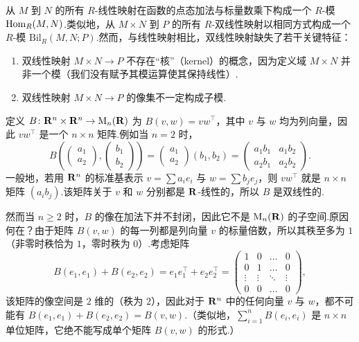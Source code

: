 从 $M$ 到 $N$ 的所有 $R$-线性映射在函数的点态加法与标量数乘下构成一个 $R$-模 $\operatorname{Hom}_R(M, N)$.类似地，从 $M \times N$ 到 $P$ 的所有 $R$-双线性映射以相同方式构成一个 $R$-模 $\mathrm{Bil}_R(M, N; P)$.然而，与线性映射相比，双线性映射缺失了若干关键特征：
\begin{enumerate}
  \item 双线性映射 $M \times N \to P$ 不存在``核''（kernel）的概念，因为定义域 $M \times N$ 并非一个模（我们没有赋予其模运算使其保持线性）.
  \item 双线性映射 $M \times N \to P$ 的像集不一定构成子模.
\end{enumerate}

\begin{example}\label{ex:rank-one}
定义 $B \colon \mathbf{R}^n \times \mathbf{R}^n \to \mathrm{M}_n(\mathbf{R})$ 为 $B(v, w) = v w^\top$，其中 $v$ 与 $w$ 均为列向量，因此 $v w^\top$ 是一个 $n \times n$ 矩阵.例如当 $n = 2$ 时，
\[
  B\left(\begin{pmatrix} a_1 \\ a_2 \end{pmatrix}, \begin{pmatrix} b_1 \\ b_2 \end{pmatrix}\right) = \begin{pmatrix} a_1 \\ a_2 \end{pmatrix} (b_1, b_2) = \begin{pmatrix} a_1 b_1 & a_1 b_2 \\ a_2 b_1 & a_2 b_2 \end{pmatrix}.
\]
一般地，若用 $\mathbf{R}^n$ 的标准基表示 $v = \sum a_i e_i$ 与 $w = \sum b_j e_j$，则 $v w^\top$ 就是 $n \times n$ 矩阵 $(a_i b_j)$.该矩阵关于 $v$ 和 $w$ 分别都是 $\mathbf{R}$-线性的，所以 $B$ 是双线性的.

然而当 $n \geq 2$ 时，$B$ 的像在加法下并不封闭，因此它不是 $\mathrm{M}_n(\mathbf{R})$ 的子空间.原因何在？由于矩阵 $B(v, w)$ 的每一列都是列向量 $v$ 的标量倍数，所以其秩至多为 $1$（非零时秩恰为 $1$，零时秩为 $0$）.考虑矩阵
\[
  B(e_1, e_1) + B(e_2, e_2) = e_1 e_1^\top + e_2 e_2^\top = \begin{pmatrix}
    1 & 0 & \dots & 0 \\
    0 & 1 & \dots & 0 \\
    \vdots & \vdots & \ddots & \vdots \\
    0 & 0 & \dots & 0
  \end{pmatrix},
\]
该矩阵的像空间是 $2$ 维的（秩为 $2$），因此对于 $\mathbf{R}^n$ 中的任何向量 $v$ 与 $w$，都不可能有 $B(e_1, e_1) + B(e_2, e_2) = B(v, w)$.（类似地，$\sum_{i=1}^n B(e_i, e_i)$ 是 $n \times n$ 单位矩阵，它绝不能写成单个矩阵 $B(v, w)$ 的形式.）
\end{example}
